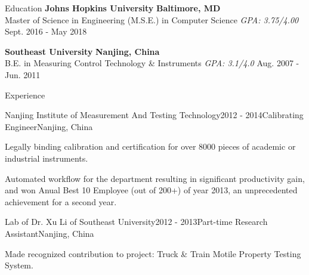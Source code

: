 \documentclass{resume} %
\begin{document}

\begin{rSection}{Education}
{\bf Johns Hopkins University} \hfill {\bf Baltimore, MD} \\
{Master of Science in Engineering (M.S.E.) in Computer Science} {\em GPA: 3.75/4.00} \hfill {Sept. 2016 - May 2018}

{\bf Southeast University} \hfill {\bf Nanjing, China} \\
{B.E. in Measuring Control Technology \& Instruments} {\em GPA: 3.1/4.0} \hfill {Aug. 2007 - Jun. 2011}
\end{rSection}



\begin{rSection}{Experience}

\begin{rSubsection}{Nanjing Institute of Measurement And Testing Technology}{2012 - 2014}{Calibrating Engineer}{Nanjing, China}
\item Legally binding calibration and certification for over 8000 pieces of academic or industrial instruments.
\item Automated workflow for the department resulting in significant productivity gain, and won Anual Best 10 Employee (out of 200+) of year 2013, an unprecedented achievement for a second year.
\end{rSubsection}

\begin{rSubsection}{Lab of Dr. Xu Li of Southeast University}{2012 - 2013}{Part-time Research Assistant}{Nanjing, China}
\item Made recognized contribution to project: Truck \& Train Motile Property Testing System.
\end{rSubsection}
\end{rSection}
\end{document}
